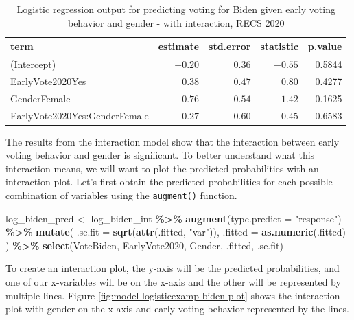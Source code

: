 \documentclass[
]{krantz}
\makeatletter
\newenvironment{Shaded}{\begin{snugshade}}{\end{snugshade}}
\newcommand{\AttributeTok}[1]{\textcolor[rgb]{0.27,0.27,0.27}{#1}}
\newcommand{\FunctionTok}[1]{\textcolor[rgb]{0.27,0.27,0.27}{\textbf{#1}}}
\newcommand{\NormalTok}[1]{#1}
\newcommand{\OtherTok}[1]{\textcolor[rgb]{0.37,0.37,0.37}{#1}}
\newcommand{\SpecialCharTok}[1]{\textcolor[rgb]{0.43,0.43,0.43}{\textbf{#1}}}
\newcommand{\StringTok}[1]{\textcolor[rgb]{0.5,0.5,0.5}{#1}}
\newenvironment{kframe}{%
\medskip{}
\setlength{\fboxsep}{.8em}
 \def\at@end@of@kframe{}%
 \ifinner\ifhmode%
  \def\at@end@of@kframe{\end{minipage}}%
  \begin{minipage}{\columnwidth}%
 \fi\fi%
 \def\FrameCommand##1{\hskip\@totalleftmargin \hskip-\fboxsep
 \colorbox{shadecolor}{##1}\hskip-\fboxsep
     \hskip-\linewidth \hskip-\@totalleftmargin \hskip\columnwidth}%
 \MakeFramed {\advance\hsize-\width
   \@totalleftmargin\z@ \linewidth\hsize
   \@setminipage}}%
 {\par\unskip\endMakeFramed%
 \at@end@of@kframe}
\renewenvironment{Shaded}{\begin{kframe}}{\end{kframe}}
\makeatother
\begin{document}
\begin{longtable}{lrrrr}
\caption{\label{tab:model-logisticexamp-biden-int-tab}Logistic regression output for predicting voting for Biden given early voting behavior and gender - with interaction, RECS 2020}\\
\toprule
term & estimate & std.error & statistic & p.value \\ 
\midrule\relax
(Intercept) & $-0.20$ & $0.36$ & $-0.55$ & 0.5844 \\ 
EarlyVote2020Yes & $0.38$ & $0.47$ & $0.80$ & 0.4277 \\ 
GenderFemale & $0.76$ & $0.54$ & $1.42$ & 0.1625 \\ 
EarlyVote2020Yes:GenderFemale & $0.27$ & $0.60$ & $0.45$ & 0.6583 \\ 
\bottomrule
\end{longtable}

The results from the interaction model show that the interaction between early voting behavior and gender is significant. To better understand what this interaction means, we will want to plot the predicted probabilities with an interaction plot. Let's first obtain the predicted probabilities for each possible combination of variables using the \texttt{augment()} function.

\begin{Shaded}
\begin{Highlighting}[]
\NormalTok{log\_biden\_pred }\OtherTok{\textless{}{-}}\NormalTok{ log\_biden\_int }\SpecialCharTok{\%\textgreater{}\%}
  \FunctionTok{augment}\NormalTok{(}\AttributeTok{type.predict =} \StringTok{"response"}\NormalTok{) }\SpecialCharTok{\%\textgreater{}\%}
  \FunctionTok{mutate}\NormalTok{(}
    \AttributeTok{.se.fit =} \FunctionTok{sqrt}\NormalTok{(}\FunctionTok{attr}\NormalTok{(.fitted, }\StringTok{"var"}\NormalTok{)),}
    \AttributeTok{.fitted =} \FunctionTok{as.numeric}\NormalTok{(.fitted)}
\NormalTok{  ) }\SpecialCharTok{\%\textgreater{}\%}
  \FunctionTok{select}\NormalTok{(VoteBiden, EarlyVote2020, Gender, .fitted, .se.fit)}
\end{Highlighting}
\end{Shaded}

To create an interaction plot, the y-axis will be the predicted probabilities, and one of our x-variables will be on the x-axis and the other will be represented by multiple lines. Figure \ref{fig:model-logisticexamp-biden-plot} shows the interaction plot with gender on the x-axis and early voting behavior represented by the lines.
\end{document}
